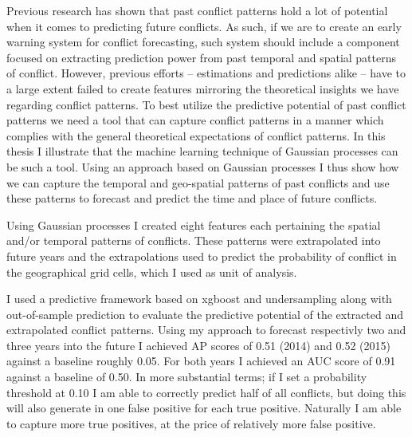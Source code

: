 \documentclass[a4paper]{article}
\begin{document}
Previous research has shown that past conflict patterns hold a lot of potential when it comes to predicting future conflicts. As such, if we are to create an early warning system for conflict forecasting, such system should include a component focused on extracting prediction power from past temporal and spatial patterns of conflict. However, previous efforts -- estimations and predictions alike -- have to a large extent failed to create features mirroring the theoretical insights we have regarding conflict patterns. To best utilize the predictive potential of past conflict patterns we need a tool that can capture conflict patterns in a manner which complies with the general theoretical expectations of conflict patterns. In this thesis I illustrate that the machine learning technique of Gaussian processes can be such a tool. Using an approach based on Gaussian processes I thus show how we can capture the temporal and geo-spatial patterns of past conflicts and use these patterns to forecast and predict the time and place of future conflicts.\par

Using Gaussian processes I created eight features each pertaining the spatial and/or temporal patterns of conflicts. These patterns were extrapolated into future years and the extrapolations used to predict the probability of conflict in the geographical grid cells, which I used as unit of analysis.\par

I used a predictive framework based on xgboost and undersampling along with out-of-sample prediction to evaluate the predictive potential of the extracted and extrapolated conflict patterns. Using my approach to forecast respectivly two and three years into the future I achieved AP scores of 0.51 (2014) and 0.52 (2015) against a baseline roughly 0.05. For both years I achieved an AUC score of 0.91 against a baseline of 0.50. In more substantial terms; if I set a probability threshold at 0.10 I am able to correctly predict half of all conflicts, but doing this will also generate in one false positive for each true positive. Naturally I am able to capture more true positives, at the price of relatively more false positive.\par 
\end{document}
